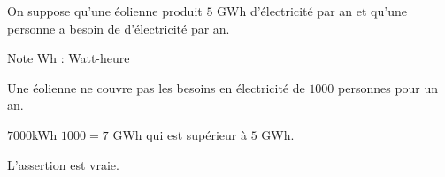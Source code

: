 \begin{exercice*}
    On suppose qu'une éolienne produit $5$ GWh d'électricité par an et qu'une
    personne a besoin de  d'électricité par an.

    \begin{minipage}{0.8\linewidth}
        \begin{myBox}{Note}
            Wh : Watt-heure
        \end{myBox}
    \end{minipage}

    Une éolienne ne couvre pas les besoins en électricité de $\num{1000}$ personnes pour un an.
\end{exercice*}
\begin{corrige}
    $\num{7000}$kWh \times $\num{1000}=7$ GWh qui est supérieur à $5$ GWh.

    L'assertion est vraie.
\end{corrige}

